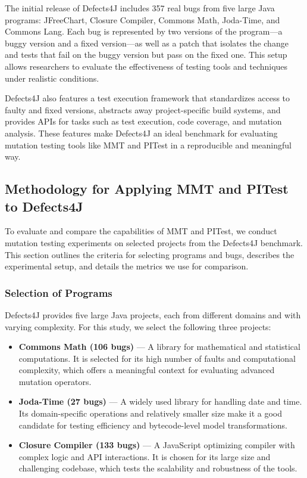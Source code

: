 \documentclass[12pt,a4paper]{article}
\begin{document}
The initial release of Defects4J includes 357 real bugs from five large Java 
programs: JFreeChart, Closure Compiler, Commons Math, Joda-Time, and Commons 
Lang. Each bug is represented by two versions of the program—a buggy version 
and a fixed version—as well as a patch that isolates the change and tests that 
fail on the buggy version but pass on the fixed one. This setup allows 
researchers to evaluate the effectiveness of testing tools and techniques under 
realistic conditions.

Defects4J also features a test execution framework that standardizes access to 
faulty and fixed versions, abstracts away project-specific build systems, and 
provides APIs for tasks such as test execution, code coverage, and mutation 
analysis. These features make Defects4J an ideal benchmark for evaluating 
mutation testing tools like MMT and PITest in a reproducible and meaningful way.

\subsection{Methodology for Applying MMT and PITest to Defects4J}

To evaluate and compare the capabilities of MMT and PITest, we conduct mutation testing experiments on selected projects from the Defects4J benchmark. This section outlines the criteria for selecting programs and bugs, describes the experimental setup, and details the metrics we use for comparison.

\subsubsection{Selection of Programs}

Defects4J provides five large Java projects, each from different domains and 
with varying complexity. For this study, we select the following three projects:

\begin{itemize}
\item \textbf{Commons Math (106 bugs)} — A library for mathematical and statistical computations. It is selected for its high number of faults and computational complexity, which offers a meaningful context for evaluating advanced mutation operators.
\item \textbf{Joda-Time (27 bugs)} — A widely used library for handling date and time. Its domain-specific operations and relatively smaller size make it a good candidate for testing efficiency and bytecode-level model transformations.
\item \textbf{Closure Compiler (133 bugs)} — A JavaScript optimizing compiler with complex logic and API interactions. It is chosen for its large size and challenging codebase, which tests the scalability and robustness of the tools.
\end{itemize}
\end{document}
